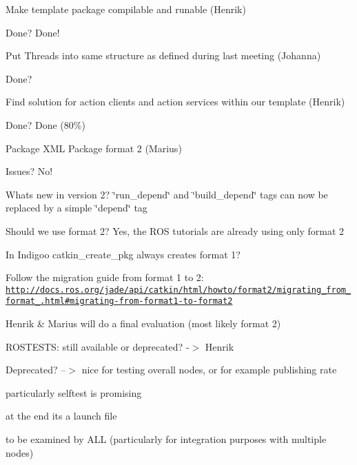 \begin{DoxyEnumerate}
\item Make template package compilable and runable (Henrik)
\begin{DoxyItemize}
\item Done? Done!
\end{DoxyItemize}
\end{DoxyEnumerate}
\begin{DoxyEnumerate}
\item Put Threads into same structure as defined during last meeting (Johanna)
\begin{DoxyItemize}
\item Done?
\end{DoxyItemize}
\end{DoxyEnumerate}
\begin{DoxyEnumerate}
\item Find solution for action clients and action services within our template (Henrik)
\begin{DoxyItemize}
\item Done? Done (80\%)
\end{DoxyItemize}
\end{DoxyEnumerate}
\begin{DoxyEnumerate}
\item Package X\+ML Package format 2 (Marius)
\begin{DoxyItemize}
\item Issues? No!
\item Whats new in version 2? \char`\"{}run\+\_\+depend\char`\"{} and \char`\"{}build\+\_\+depend\char`\"{} tags can now be replaced by a simple \char`\"{}depend\char`\"{} tag
\item Should we use format 2? Yes, the R\+OS tutorials are already using only format 2
\item In Indigoo catkin\+\_\+create\+\_\+pkg always creates format 1?
\item Follow the migration guide from format 1 to 2\+: \href{http://docs.ros.org/jade/api/catkin/html/howto/format2/migrating_from_format_1.html#migrating-from-format1-to-format2}{\tt http\+://docs.\+ros.\+org/jade/api/catkin/html/howto/format2/migrating\+\_\+from\+\_\+format\+\_.\+html\#migrating-\/from-\/format1-\/to-\/format2}
\item Henrik \& Marius will do a final evaluation (most likely format 2)
\end{DoxyItemize}
\end{DoxyEnumerate}
\begin{DoxyEnumerate}
\item R\+O\+S\+T\+E\+S\+TS\+: still available or deprecated? -\/$>$ Henrik
\begin{DoxyItemize}
\item Deprecated? --$>$ nice for testing overall nodes, or for example publishing rate
\item particularly selftest is promising
\item at the end it\textquotesingle{}s a launch file
\item to be examined by A\+LL (particularly for integration purposes with multiple nodes)
\end{DoxyItemize}
\end{DoxyEnumerate}
